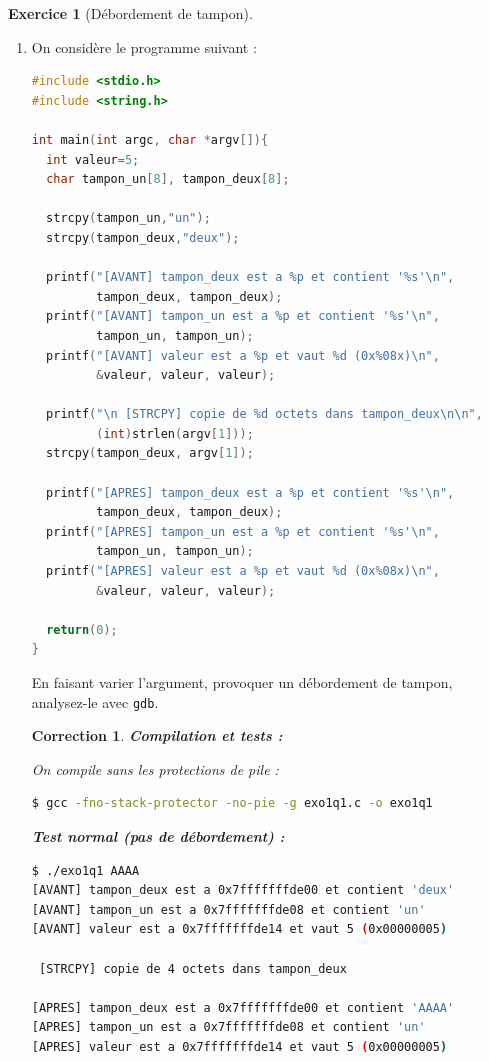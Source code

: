 \documentclass[a4paper,11pt]{article}
\theoremstyle{plain}
\newtheorem{correction}{Correction}
\theoremstyle{definition}
\newtheorem{exercice}{Exercice}
\begin{document}
\begin{exercice}[Débordement de tampon]
\begin{enumerate}
\item
On considère le programme suivant :
\begin{lstlisting}[language=C]
#include <stdio.h>
#include <string.h>

int main(int argc, char *argv[]){
  int valeur=5;
  char tampon_un[8], tampon_deux[8];

  strcpy(tampon_un,"un");
  strcpy(tampon_deux,"deux");

  printf("[AVANT] tampon_deux est a %p et contient '%s'\n",
         tampon_deux, tampon_deux);
  printf("[AVANT] tampon_un est a %p et contient '%s'\n",
         tampon_un, tampon_un);
  printf("[AVANT] valeur est a %p et vaut %d (0x%08x)\n",
         &valeur, valeur, valeur);

  printf("\n [STRCPY] copie de %d octets dans tampon_deux\n\n",
         (int)strlen(argv[1]));
  strcpy(tampon_deux, argv[1]);

  printf("[APRES] tampon_deux est a %p et contient '%s'\n",
         tampon_deux, tampon_deux);
  printf("[APRES] tampon_un est a %p et contient '%s'\n",
         tampon_un, tampon_un);
  printf("[APRES] valeur est a %p et vaut %d (0x%08x)\n",
         &valeur, valeur, valeur);

  return(0);
}
\end{lstlisting}

En faisant varier l'argument, provoquer un débordement de tampon, analysez-le avec \texttt{gdb}.

\begin{correction}
\textbf{Compilation et tests :}

On compile sans les protections de pile :
\begin{lstlisting}[language=bash,numbers=none]
$ gcc -fno-stack-protector -no-pie -g exo1q1.c -o exo1q1
\end{lstlisting}

\textbf{Test normal (pas de débordement) :}
\begin{lstlisting}[language=bash,numbers=none]
$ ./exo1q1 AAAA
[AVANT] tampon_deux est a 0x7fffffffde00 et contient 'deux'
[AVANT] tampon_un est a 0x7fffffffde08 et contient 'un'
[AVANT] valeur est a 0x7fffffffde14 et vaut 5 (0x00000005)

 [STRCPY] copie de 4 octets dans tampon_deux

[APRES] tampon_deux est a 0x7fffffffde00 et contient 'AAAA'
[APRES] tampon_un est a 0x7fffffffde08 et contient 'un'
[APRES] valeur est a 0x7fffffffde14 et vaut 5 (0x00000005)
\end{lstlisting}


\end{correction}
\end{enumerate}
\end{exercice}
\end{document}
